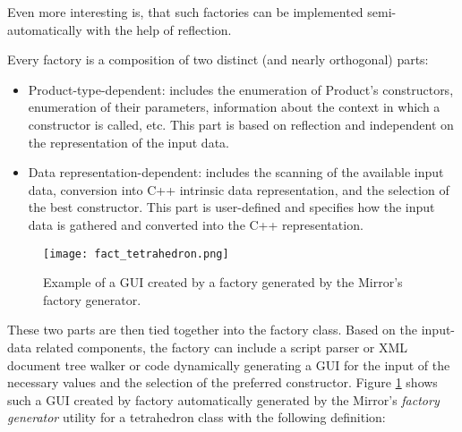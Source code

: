 Even more interesting is, that such factories can be
implemented semi-automatically with the help of reflection.

Every factory is a composition of two distinct (and nearly orthogonal)
parts:

\begin{itemize}
\item{Product-type-dependent}: includes the enumeration of Product's
constructors, enumeration of their parameters, information about
the context in which a constructor is called, etc. This part is based
on reflection and independent on the representation of the input data.

\item{Data representation-dependent}: includes the scanning of the
available input data, conversion into C++ intrinsic data representation,
and the selection of the best constructor. This part is user-defined
and specifies how the input data is gathered and converted into the
C++ representation.
\end{itemize}

\begin{figure}[!th]
\centering
\texttt{[image: fact\_tetrahedron.png]}
\caption{Example of a GUI created by a factory generated by
the Mirror's factory generator.}
\label{fig:fact-tetrahedron}
\end{figure}

These two parts are then tied together into the factory class. Based
on the input-data related components, the factory can include a script parser
or XML document tree walker or code dynamically generating a GUI
for the input of the necessary values and the selection of the preferred
constructor. Figure \ref{fig:fact-tetrahedron} shows such a GUI created
by factory automatically generated by the Mirror's {\em factory generator}
utility for a tetrahedron class with the following definition:

